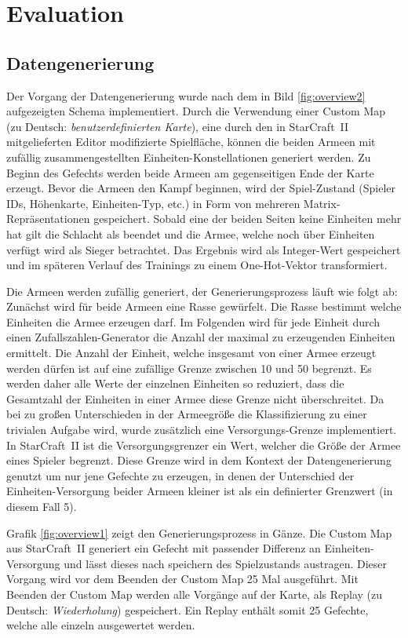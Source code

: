 \section{Evaluation}

\subsection{Datengenerierung}
\label{datagen}

Der Vorgang der Datengenerierung wurde nach dem in Bild \ref{fig:overview2} aufgezeigten Schema implementiert. Durch die Verwendung einer Custom Map (zu Deutsch: \textit{benutzerdefinierten Karte}), eine durch den in StarCraft~II mitgelieferten Editor modifizierte Spielfläche, können die beiden Armeen mit zufällig zusammengestellten Einheiten-Konstellationen generiert werden. Zu Beginn des Gefechts werden beide Armeen am gegenseitigen Ende der Karte erzeugt. Bevor die Armeen den Kampf beginnen, wird der Spiel-Zustand (Spieler IDs, Höhenkarte, Einheiten-Typ, etc.) in Form von mehreren Matrix-Repräsentationen gespeichert. Sobald eine der beiden Seiten keine Einheiten mehr hat gilt die Schlacht als beendet und die Armee, welche noch über Einheiten verfügt wird als Sieger betrachtet. Das Ergebnis wird als Integer-Wert gespeichert und im späteren Verlauf des Trainings zu einem One-Hot-Vektor transformiert. 

Die Armeen werden zufällig generiert, der Generierungsprozess läuft wie folgt ab: Zunächst wird für beide Armeen eine Rasse gewürfelt. Die Rasse bestimmt welche Einheiten die Armee erzeugen darf. Im Folgenden wird für jede Einheit durch einen Zufallszahlen-Generator die Anzahl der maximal zu erzeugenden Einheiten ermittelt. Die Anzahl der Einheit, welche insgesamt von einer Armee erzeugt werden dürfen ist auf eine zufällige Grenze zwischen 10 und 50 begrenzt. Es werden daher alle Werte der einzelnen Einheiten so reduziert, dass die Gesamtzahl der Einheiten in einer Armee diese Grenze nicht überschreitet. Da bei zu großen Unterschieden in der Armeegröße die Klassifizierung zu einer trivialen Aufgabe wird, wurde zusätzlich eine Versorgungs-Grenze implementiert. In StarCraft~II ist die Versorgungsgrenzer ein Wert, welcher die Größe der Armee eines Spieler begrenzt. Diese Grenze wird in dem Kontext der Datengenerierung genutzt um nur jene Gefechte zu erzeugen, in denen der Unterschied der Einheiten-Versorgung beider Armeen kleiner ist als ein definierter Grenzwert (in diesem Fall 5).

Grafik \ref{fig:overview1} zeigt den Generierungsprozess in Gänze. Die Custom Map aus StarCraft~II generiert ein Gefecht mit passender Differenz an Einheiten-Versorgung und lässt dieses nach speichern des Spielzustands austragen. Dieser Vorgang wird vor dem Beenden der Custom Map 25 Mal ausgeführt. Mit Beenden der Custom Map werden alle Vorgänge auf der Karte, als Replay (zu Deutsch: \textit{Wiederholung}) gespeichert. Ein Replay enthält somit 25 Gefechte, welche alle einzeln ausgewertet werden. 

